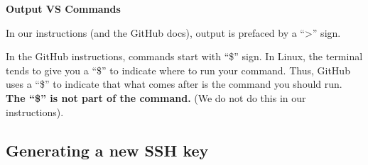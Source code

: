 \documentclass[
]{book}
\newenvironment{bluebox}{
  \definecolor{shadecolor}{RGB}{172, 210, 237}
  \color{white}
  \begin{shaded}}
 {\end{shaded}}
\theoremstyle{definition}
\theoremstyle{definition}
\theoremstyle{definition}
\theoremstyle{definition}
\theoremstyle{remark}
\begin{document}
\begin{bluebox}

\begin{center}
\textbf{Output VS Commands}

\end{center}

In our instructions (and the GitHub docs), output is prefaced by a ``\textgreater{}'' sign.

In the GitHub instructions, commands start with ``\$'' sign. In Linux, the terminal tends to give you a ``\$'' to indicate where to run your command. Thus, GitHub uses a ``\$'' to indicate that what comes after is the command you should run. \textbf{The ``\$'' is not part of the command.} (We do not do this in our instructions).

\end{bluebox}

\subsection{Generating a new SSH key}\label{generating-a-new-ssh-key}
\end{document}
